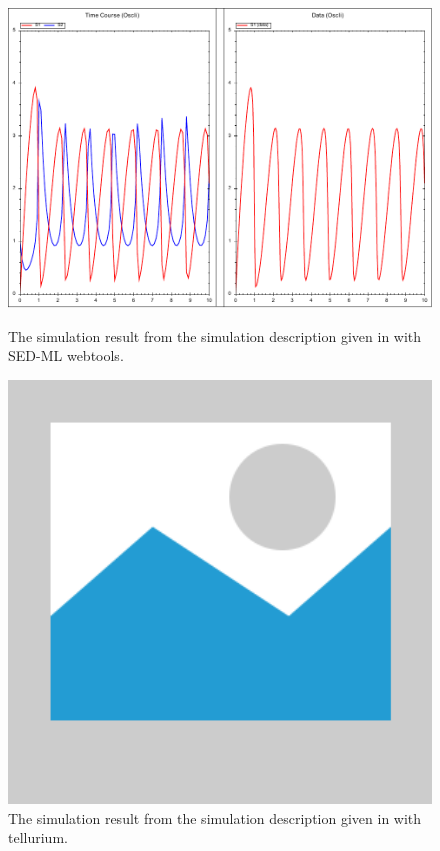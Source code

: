 \begin{figure}[ht]
    \centering
    \begin{minipage}{0.47\textwidth}
        \centering
        \includegraphics[width=1.0\textwidth]{examples/plotting-data/results/plotting-data}
        \caption{The simulation result from the simulation description given in  with SED-ML webtools.}
    \end{minipage}\hfill
    \begin{minipage}{0.47\textwidth}
        \centering
        \includegraphics[width=1.0\textwidth]{examples/placeholder}
        \caption{The simulation result from the simulation description given in  with tellurium.}
    \end{minipage}
    \label{fig:plotting-data}
\end{figure}

